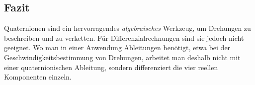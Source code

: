 \subsection{Fazit}
Quaternionen sind ein hervorragendes
\emph{algebraisches} Werkzeug, um Drehungen zu beschreiben und zu verketten. Für 
Differenzialrechnungen sind sie jedoch nicht geeignet. Wo man in einer Anwendung 
Ableitungen benötigt, etwa bei
der Geschwindigkeitsbestimmung von Drehungen, arbeitet man deshalb
nicht mit einer quaternionischen Ableitung, sondern differenziert die vier
reellen Komponenten einzeln.
